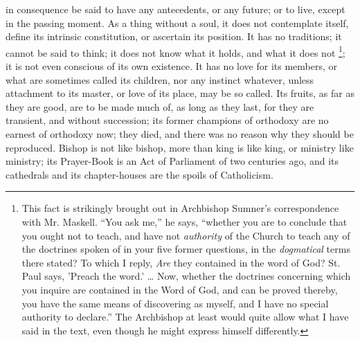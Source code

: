 in consequence be said to have any antecedents, or any future; or to
live, except in the passing moment. As a thing without a soul, it does
not contemplate itself, define its intrinsic constitution, or
ascertain its position. It has no traditions; it cannot be said to
think; it does not know what it holds, and what it does not \footnote{This fact is strikingly brought out in Archbishop Sumner's
correspondence with Mr. Maskell. ``You ask me,'' he says,
``whether you are to conclude that you ought not to teach, and
have not \emph{authority} of the Church to teach any of the doctrines
spoken of in your five former questions, in the \emph{dogmatical}
terms there stated? To which I reply, \emph{Are} they contained in the
word of God? St. Paul says, 'Preach the word.' … Now, whether the
doctrines concerning which you inquire are contained in the Word of
God, and can be proved thereby, you have the same means of discovering
as myself, and I have no special authority to declare.'' The
Archbishop at least would quite allow what I have said in the text,
even though he might express himself differently.};
it is not even conscious of its own existence. It has no love for its
members, or what are sometimes called its children, nor any instinct
whatever, unless attachment to its master, or love of its place, may
be so called. Its fruits, as far as they are good, are to be made much
of, as long as they last, for they are transient, and without
succession; its former champions of orthodoxy are no earnest of
orthodoxy now; they died, and there was no reason why they should be
reproduced. Bishop is not like bishop, more than king is like king, or
ministry like ministry; its Prayer-Book is an Act of Parliament of two
centuries ago, and its cathedrals and its chapter-houses are the
spoils of Catholicism.

